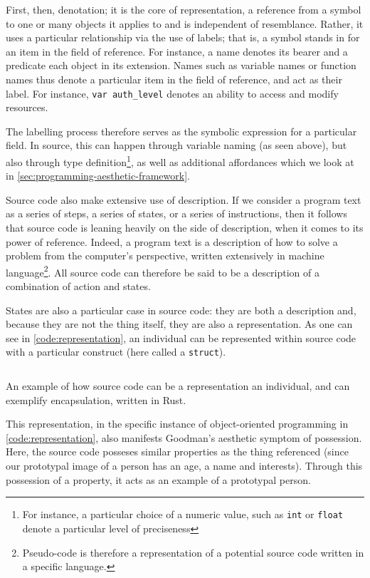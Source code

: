 First, then, denotation; it is the core of representation, a reference from a symbol to one or many objects it applies to and is independent of resemblance. Rather, it uses a particular relationship via the use of labels; that is, a symbol stands in for an item in the field of reference. For instance, a name denotes its bearer and a predicate each object in its extension. Names such as variable names or function names thus denote a particular item in the field of reference, and act as their label. For instance, \lstinline{var auth_level} denotes an ability to access and modify resources.

The labelling process therefore serves as the symbolic expression for a particular field. In source, this can happen through variable naming (as seen above), but also through type definition\footnote{For instance, a particular choice of a numeric value, such as \lstinline{int} or \lstinline{float} denote a particular level of preciseness}, as well as additional affordances which we look at in \ref{sec:programming-aesthetic-framework}.

Source code also make extensive use of description. If we consider a program text as a series of steps, a series of states, or a series of instructions, then it follows that source code is leaning heavily on the side of description, when it comes to its power of reference. Indeed, a program text is a description of how to solve a problem from the computer's perspective, written extensively in machine language\footnote{Pseudo-code is therefore a representation of a potential source code written in a specific language.}. All source code can therefore be said to be a description of a combination of action and states.

States are also a particular case in source code: they are both a description and, because they are not the thing itself, they are also a representation. As one can see in \ref{code:representation}, an individual can be represented within source code with a particular construct (here called a \lstinline{struct}).

\begin{listing}
    \inputminted{rust}{./corpus/representation.rs}
    \caption{An example of how source code can be a representation an individual, and can exemplify encapsulation, written in Rust.}
    \label{code:representation}
\end{listing}

This representation, in the specific instance of object-oriented programming in \ref{code:representation}, also manifests Goodman's aesthetic symptom of possession. Here, the source code posseses similar properties as the thing referenced (since our prototypal image of a person has an age, a name and interests). Through this possession of a property, it acts as an example of a prototypal person.

